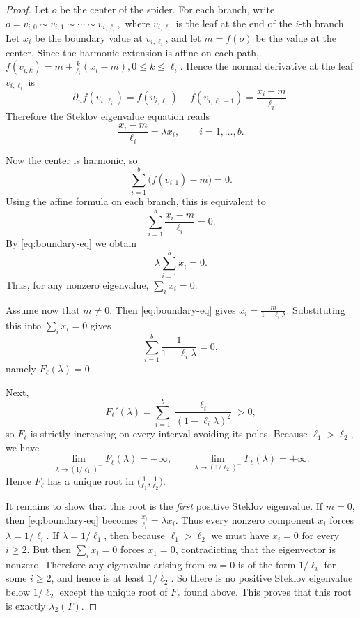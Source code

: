 \documentclass[11pt]{article}
\theoremstyle{remark}
\begin{document}
\begin{proof}
Let $o$ be the center of the spider.
For each branch, write $
o=v_{i,0}\sim v_{i,1}\sim \cdots \sim v_{i,\ell_i},$
where $v_{i,\ell_i}$ is the leaf at the end of the $i$-th branch.
Let $x_i$ be the boundary value at $v_{i,\ell_i}$, and let $m=f(o)$
be the value at the center.
Since the harmonic extension is affine on each path,
$f(v_{i,k})=m+\frac{k}{\ell_i}(x_i-m), 0\le k\le \ell_i.$
Hence the normal derivative at the leaf $v_{i,\ell_i}$ is
$$
\partial_n f(v_{i,\ell_i})
=
 f(v_{i,\ell_i})-f(v_{i,\ell_i-1})
=
\frac{x_i-m}{\ell_i}.
$$
Therefore the Steklov eigenvalue equation reads
\begin{equation}\label{eq:boundary-eq}
\frac{x_i-m}{\ell_i}=\lambda x_i,
\qquad i=1,\dots,b.
\end{equation}

Now the center is harmonic, so
$$
\sum_{i=1}^b \bigl(f(v_{i,1})-m\bigr)=0.
$$
Using the affine formula on each branch, this is equivalent to
$$
\sum_{i=1}^b \frac{x_i-m}{\ell_i}=0.
$$
By \eqref{eq:boundary-eq} we obtain
$$
\lambda\sum_{i=1}^b x_i=0.
$$
Thus, for any nonzero eigenvalue, $\sum_i x_i=0$.

Assume now that $m\neq 0$.
Then \eqref{eq:boundary-eq} gives
$x_i=\frac{m}{1-\ell_i\lambda}.$
Substituting this into $\sum_i x_i=0$ gives
$$
\sum_{i=1}^b \frac{1}{1-\ell_i\lambda}=0,
$$
namely
$F_{\ell}(\lambda)=0.$

Next,
$$
F_{\ell}'(\lambda)=\sum_{i=1}^b \frac{\ell_i}{(1-\ell_i\lambda)^2}>0,
$$
so $F_{\ell}$ is strictly increasing on every interval avoiding its poles.
Because $\ell_1>\ell_2$, we have
$$
\lim_{\lambda\to (1/\ell_1)^+} F_{\ell}(\lambda)=-\infty,
\qquad
\lim_{\lambda\to (1/\ell_2)^-} F_{\ell}(\lambda)=+\infty.
$$
Hence $F_{\ell}$ has a unique root in
$\bigl(\frac1{\ell_1},\frac1{\ell_2}\bigr)$.

It remains to show that this root is the \emph{first} positive Steklov eigenvalue.
If $m=0$, then \eqref{eq:boundary-eq} becomes
$\frac{x_i}{\ell_i}=\lambda x_i.$
Thus every nonzero component $x_i$ forces $\lambda=1/\ell_i$.
If $\lambda=1/\ell_1$, then because $\ell_1>\ell_2$ we must have $x_i=0$ for every $i\ge 2$.
But then $\sum_i x_i=0$ forces $x_1=0$, contradicting that the eigenvector is nonzero.
Therefore any eigenvalue arising from $m=0$ is of the form $1/\ell_i$ for some $i\ge 2$, and hence
is at least $1/\ell_2$.
So there is no positive Steklov eigenvalue below $1/\ell_2$ except the unique root of
$F_{\ell}$ found above.
This proves that this root is exactly $\lambda_2(T)$.
\end{proof}
\end{document}
